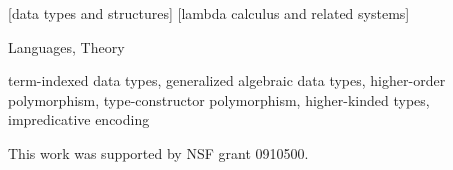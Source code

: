 \documentclass[preprint]{sigplanconf}
\theoremstyle{plain}
\theoremstyle{remark}
\theoremstyle{definition}
\begin{document}
[data types and structures]
[lambda calculus and related systems]

\terms
Languages, Theory

\keywords
term-indexed data types, generalized algebraic data types,
higher-order polymorphism, type-constructor polymorphism, higher-kinded types,
impredicative encoding











\vspace{-1pt}
\acks\vspace{-1pt}
This work was supported by NSF grant 0910500.
\vspace{-3pt}







\end{document}
